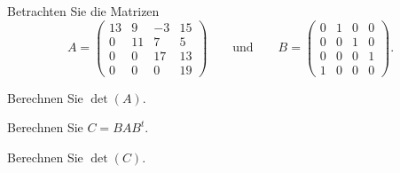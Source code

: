 Betrachten Sie die Matrizen
\[
A=\begin{pmatrix}
13& 9&-3&15\\
 0&11& 7& 5\\
 0& 0&17&13\\
 0& 0& 0&19
\end{pmatrix}
\qquad\text{und}\qquad
B
=
\begin{pmatrix}
0&1&0&0\\
0&0&1&0\\
0&0&0&1\\
1&0&0&0
\end{pmatrix}.
\]
\begin{teilaufgaben}
\item Berechnen Sie $\det(A)$.
\item Berechnen Sie $C=BAB^t$.
\item Berechnen Sie $\det(C)$.
\end{teilaufgaben}



